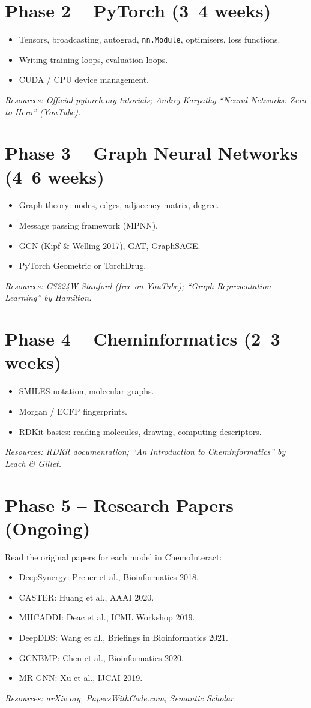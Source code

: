 \documentclass[12pt,a4paper,oneside]{book}
\begin{document}
\section{Phase 2 -- PyTorch (3--4 weeks)}
\begin{itemize}
  \item Tensors, broadcasting, autograd, \texttt{nn.Module}, optimisers, loss functions.
  \item Writing training loops, evaluation loops.
  \item CUDA / CPU device management.
\end{itemize}
\textit{Resources: Official pytorch.org tutorials; Andrej Karpathy ``Neural Networks: Zero to Hero'' (YouTube).}

\section{Phase 3 -- Graph Neural Networks (4--6 weeks)}
\begin{itemize}
  \item Graph theory: nodes, edges, adjacency matrix, degree.
  \item Message passing framework (MPNN).
  \item GCN (Kipf \& Welling 2017), GAT, GraphSAGE.
  \item PyTorch Geometric or TorchDrug.
\end{itemize}
\textit{Resources: CS224W Stanford (free on YouTube); ``Graph Representation Learning'' by Hamilton.}

\section{Phase 4 -- Cheminformatics (2--3 weeks)}
\begin{itemize}
  \item SMILES notation, molecular graphs.
  \item Morgan / ECFP fingerprints.
  \item RDKit basics: reading molecules, drawing, computing descriptors.
\end{itemize}
\textit{Resources: RDKit documentation; ``An Introduction to Cheminformatics'' by Leach \& Gillet.}

\section{Phase 5 -- Research Papers (Ongoing)}
Read the original papers for each model in ChemoInteract:
\begin{itemize}
  \item DeepSynergy: Preuer et al., Bioinformatics 2018.
  \item CASTER: Huang et al., AAAI 2020.
  \item MHCADDI: Deac et al., ICML Workshop 2019.
  \item DeepDDS: Wang et al., Briefings in Bioinformatics 2021.
  \item GCNBMP: Chen et al., Bioinformatics 2020.
  \item MR-GNN: Xu et al., IJCAI 2019.
\end{itemize}
\textit{Resources: arXiv.org, PapersWithCode.com, Semantic Scholar.}
\end{document}
